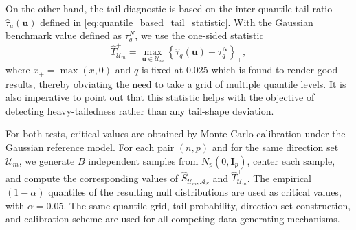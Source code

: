 \documentclass[11pt]{article}
\theoremstyle{plain}
\theoremstyle{definition}
\theoremstyle{remark}
\def\u{\bm{u}}
\newcommand{\identity}{\mathbf{I}}
\begin{document}
On the other hand, the tail diagnostic is based on the inter-quantile tail ratio $\widehat\tau_{a}(\u)$ defined in \eqref{eq:quantile_based_tail_statistic}. With the Gaussian benchmark value defined as $\tau_q^N$, we use the one-sided statistic
\begin{equation*}
        \widehat T_{\mathcal U_m}^{+} = \max_{\u\in\mathcal U_m} \left\{\widehat\tau_{q}(\u) - \tau_q^N\right\}_{+},
\end{equation*}
where $x_+=\max(x,0)$ and $q$ is fixed at 0.025 which is found to render good results, thereby obviating the need to take a grid of multiple quantile levels. It is also imperative to point out that this statistic helps with the objective of detecting heavy-tailedness rather than any tail-shape deviation. 

For both tests, critical values are obtained by Monte Carlo calibration under the Gaussian reference model.  For each pair $(n,p)$ and for the same direction set $\mathcal U_m$, we generate $B$ independent samples from $N_p(0,\identity_p)$, center each sample, and compute the corresponding values of $\widehat S_{\mathcal U_m,\mathcal A_S}$ and $\widehat T_{\mathcal U_m}^{+}$.  The empirical $(1-\alpha)$ quantiles of the resulting null distributions are used as critical values, with $\alpha=0.05$. The same quantile grid, tail probability, direction set construction, and calibration scheme are used for all competing data-generating mechanisms.
\end{document}
